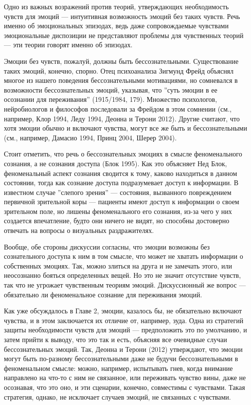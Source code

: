 \documentclass[11pt]{book}
\begin{document}
Одно из важных возражений против теорий, утверждающих необходимость чувств для эмоций --- интуитивная возможность эмоций без таких чувств. Речь именно об эмоциональных эпизодах, ведь даже сопровождаемые чувствами эмоциональные диспозиции не представляют проблемы для чувственных теорий --- эти теории говорят именно об эпизодах.

Эмоции без чувств, пожалуй, должны быть бессознательными. Существование таких эмоций, конечно, спорно. Отец психоанализа Зигмунд Фрейд объяснял многое из нашего поведения бессознательными мотивациями, но сомневался в возможности бессознательных эмоций, указывая, что ''суть эмоции в ее осознании для переживания'' (1915/1984, 179). Множество психологов, нейробиологов и философов последовали за Фрейдом в этом сомнении (см., например, Клор 1994, Леду 1994, Деонна и Терони 2012). Другие считают, что хотя эмоции обычно и включают чувства, могут все же быть и бессознательными (см., например, Дамасио 1994, Принц 2004, Шерер 2004).

Стоит отметить, что речь о бессознательных эмоциях в смысле феноменального сознания, а не сознания доступа (Блок 1995). Как это объясняет Нед Блок, феноменальный аспект сознания сводится к тому, каково находиться в данном состоянии, тогда как сознание доступа подразумевает доступ к информации. В известном случае ''слепого зрения'' --- состояния, вызванного повреждением первичной зрительной коры --- пациенты имеют доступ к информации о своем зрительном поле, но лишены феноменального его сознания, из-за чего у них создается впечатление, будто они ничего не видят, но способны достоверно отвечать на вопросы о визуальных раздражителях.

Вообще, обе стороны дискуссии согласны, что эмоции возможны без сознательного доступа к ним в том смысле, что может не хватать информации о собственных эмоциях. Так, можно злиться на друга и не замечать этого, или неосознанно бояться определенных вещей. Но это не значит отсутствие чувств, так что не угрожает чувственным теориям эмоций. Дискуссионный же вопрос --- обязательно ли феноменальное сознание для переживания эмоций.

Как уже обсуждалось в Главе 2, эмоции, казалось бы, не обязательно включают чувства, и в этом заключается их отличие от, например, зуда. Одна из стратегий защиты необходимости чувств для эмоций --- предположить это по умолчанию, и затем прийти к выводу, что это так и есть, объясняя все очевидные случаи бессознательных эмоций. Так, Деонна и Терони (2012) утверждают, что эмоции могут быть по-разному бессознательными даже не будучи бессознательными в феноменальном смысле: можно, например, испытывать гнев, когда внимание направлено на что-то с ним не связанное, или переживать чувство вины, даже не осознавая, что это оно, и эти сценарии, конечно, совместимы с чувствами. Такая стратегия, однако, не исключает случаев эмоций, не связанных с чувствами.
\end{document}

